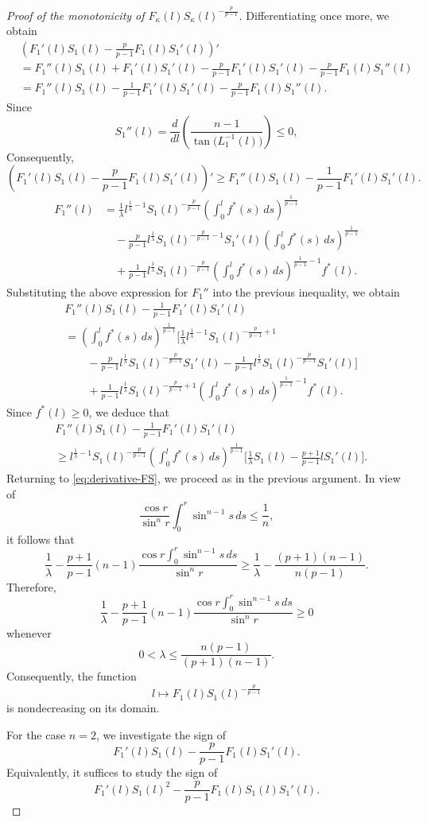 \documentclass[11pt]{article}
\numberwithin{equation}{section}
\theoremstyle{definition}
\theoremstyle{remark}
\begin{document}
\begin{proof}[Proof of the monotonicity of $F_\kappa(l)S_\kappa(l)^{-\frac{p}{p-1}}$]
Differentiating once more, we obtain
\begin{align*}
&
\left(
F_1'(l)S_1(l)
-\frac{p}{p-1}F_1(l)S_1'(l)
\right)'
\\
&=
F_1''(l)S_1(l)
+F_1'(l)S_1'(l)
-\frac{p}{p-1}F_1'(l)S_1'(l)
-\frac{p}{p-1}F_1(l)S_1''(l)
\\
&=
F_1''(l)S_1(l)
-\frac{1}{p-1}F_1'(l)S_1'(l)
-\frac{p}{p-1}F_1(l)S_1''(l).
\end{align*}
\noindent
Since
\[
S_1''(l)
=
\frac{d}{dl}
\left(
\frac{n-1}{\tan\bigl(L_1^{-1}(l)\bigr)}
\right)
\le 0,
\]
\noindent
Consequently,
\[
\left(
F_1'(l)S_1(l)
-\frac{p}{p-1}F_1(l)S_1'(l)
\right)'
\ge
F_1''(l)S_1(l)
-\frac{1}{p-1}F_1'(l)S_1'(l).
\]
\begin{align*}
F_1''(l)
&=
\frac1\lambda
l^{\frac1\lambda-1}
S_1(l)^{-\frac{p}{p-1}}
\left(
\int_0^l f^*(s)\,ds
\right)^{\frac1{p-1}}
\\
&\quad
-\frac{p}{p-1}
l^{\frac1\lambda}
S_1(l)^{-\frac{p}{p-1}-1}
S_1'(l)
\left(
\int_0^l f^*(s)\,ds
\right)^{\frac1{p-1}}
\\
&\quad
+\frac1{p-1}
l^{\frac1\lambda}
S_1(l)^{-\frac{p}{p-1}}
\left(
\int_0^l f^*(s)\,ds
\right)^{\frac1{p-1}-1}
f^*(l).
\end{align*}
Substituting the above expression for $F_1''$ into the previous inequality, we obtain
\begin{align*}
&
F_1''(l)S_1(l)
-\frac1{p-1}F_1'(l)S_1'(l)
\\
&=
\left(
\int_0^l f^*(s)\,ds
\right)^{\frac1{p-1}}
\Biggl[
\frac1\lambda
l^{\frac1\lambda-1}
S_1(l)^{-\frac{p}{p-1}+1}
\\
&\qquad
-\frac{p}{p-1}
l^{\frac1\lambda}
S_1(l)^{-\frac{p}{p-1}}
S_1'(l)
-\frac1{p-1}
l^{\frac1\lambda}
S_1(l)^{-\frac{p}{p-1}}
S_1'(l)
\Biggr]
\\
&\qquad
+\frac1{p-1}
l^{\frac1\lambda}
S_1(l)^{-\frac{p}{p-1}+1}
\left(
\int_0^l f^*(s)\,ds
\right)^{\frac1{p-1}-1}
f^*(l).
\end{align*}
\noindent
Since $f^*(l)\ge0$, we deduce that
\begin{align*}
&
F_1''(l)S_1(l)
-\frac1{p-1}F_1'(l)S_1'(l)
\\
&\ge
l^{\frac1\lambda-1}
S_1(l)^{-\frac{p}{p-1}}
\left(
\int_0^l f^*(s)\,ds
\right)^{\frac1{p-1}}
\Biggl[
\frac1\lambda S_1(l)
-\frac{p+1}{p-1}lS_1'(l)
\Biggr].
\end{align*}
Returning to \eqref{eq:derivative-FS}, we proceed as in the previous argument. In view of
\[
\frac{\cos r}{\sin^n r}
\int_0^r \sin^{n-1}s\,ds
\le \frac1n,
\]
it follows that
\[
\frac1\lambda
-\frac{p+1}{p-1}(n-1)
\frac{\cos r\int_0^r \sin^{n-1}s\,ds}
{\sin^n r}
\ge
\frac1\lambda
-\frac{(p+1)(n-1)}{n(p-1)}.
\]
\noindent
Therefore,
\[
\frac1\lambda
-\frac{p+1}{p-1}(n-1)
\frac{\cos r\int_0^r \sin^{n-1}s\,ds}
{\sin^n r}
\ge0
\]
whenever
\[
0<\lambda\le
\frac{n(p-1)}{(p+1)(n-1)}.
\]
\noindent
Consequently, the function
\[
l\mapsto
F_1(l)S_1(l)^{-\frac{p}{p-1}}
\]
is nondecreasing on its domain.
\par
For the case $n=2$, we investigate the sign of
\[
F_1'(l)S_1(l)
-\frac{p}{p-1}F_1(l)S_1'(l).
\]
Equivalently, it suffices to study the sign of
\[
F_1'(l)S_1(l)^2
-\frac{p}{p-1}F_1(l)S_1(l)S_1'(l).
\]


\end{proof}
\end{document}
